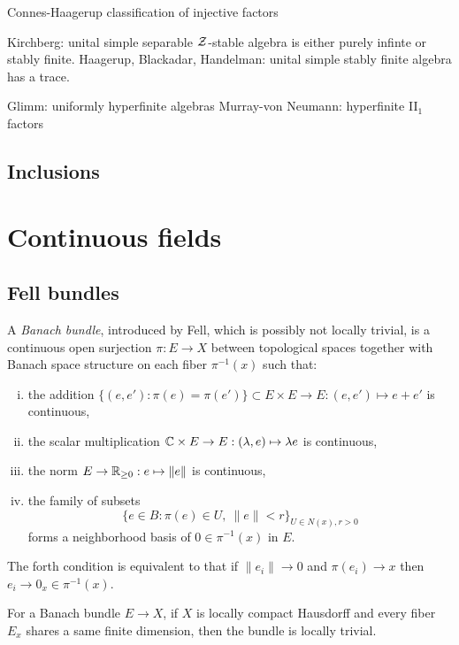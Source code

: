 \documentclass{../../large}
\begin{document}
Connes-Haagerup classification of injective factors

Kirchberg: unital simple separable $\mathcal{Z}$-stable algebra is either purely infinte or stably finite.
Haagerup, Blackadar, Handelman: unital simple stably finite algebra has a trace.

Glimm: uniformly hyperfinite algebras
Murray-von Neumann: hyperfinite II$_1$ factors




\section{Inclusions}










\chapter{Continuous fields}


\section{Fell bundles}

\begin{prb}
A \emph{Banach bundle}, introduced by Fell, which is possibly not locally trivial, is a continuous open surjection $\pi:E\to X$ between topological spaces together with Banach space structure on each fiber $\pi^{-1}(x)$ such that:
\begin{enumerate}[(i)]
\item the addition $\{(e,e'):\pi(e)=\pi(e')\}\subset E\times E\to E:(e,e')\mapsto e+e'$ is continuous,
\item the scalar multiplication $\mathbb{C}\times E\to E:(\lambda,e)\mapsto\lambda e$ is continuous,
\item the norm $E\to\mathbb{R}_{\ge0}:e\mapsto\|e\|$ is continuous,
\item the family of subsets
\[\{e\in B:\pi(e)\in U,\ \|e\|<r\}_{U\in N(x),r>0}\]
forms a neighborhood basis of $0\in\pi^{-1}(x)$ in $E$.
\end{enumerate}
The forth condition is equivalent to that if $\|e_i\|\to0$ and $\pi(e_i)\to x$ then $e_i\to 0_x\in\pi^{-1}(x)$.
\begin{parts}
\item For a Banach bundle $E\to X$, if $X$ is locally compact Hausdorff and every fiber $E_x$ shares a same finite dimension, then the bundle is locally trivial.
\end{parts}
\end{prb}
\end{document}

